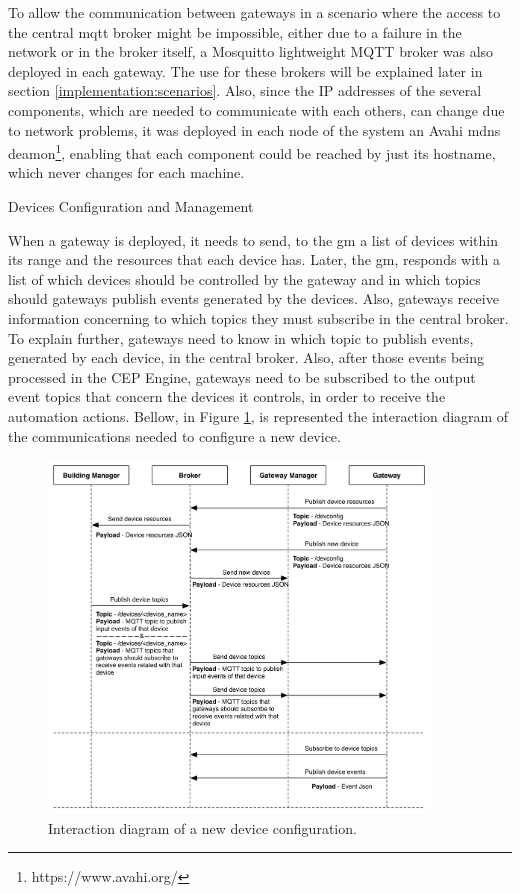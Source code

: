 To allow the communication between gateways in a scenario where the access to the central \ac{mqtt} broker might be impossible, either due to a failure in the network or in the broker itself, a Mosquitto lightweight MQTT broker was also deployed in each gateway. The use for these brokers will be explained later in section \ref{implementation:scenarios}. Also, since the IP addresses of the several components, which are needed to communicate with each others, can change due to network problems, it was deployed in each node of the system an Avahi \acf{mdns} deamon\footnote{https://www.avahi.org/}, enabling that each component could be reached by just its hostname, which never changes for each machine.


\begin{Paragraph}{Devices Configuration and Management}

When a gateway is deployed, it needs to send, to the \ac{gm} a list of devices within its range and the resources that each device has. Later, the \ac{gm}, responds with a list of which devices should be controlled by the gateway and in which topics should gateways publish events generated by the devices. Also, gateways receive information concerning to which topics they must subscribe in the central broker. To explain further, gateways need to know in which topic to publish events, generated by each device, in the central broker. Also, after those events being processed in the CEP Engine, gateways need to be subscribed to the output event topics that concern the devices it controls, in order to receive the automation actions. Bellow, in Figure \ref{fig:newdevice}, is represented the interaction diagram of the communications needed to configure a new device. 


\begin{figure}[H]
	\centering
	\includegraphics[width=0.9\textwidth]{figures/newdevice.png}
	\caption{Interaction diagram of a new device configuration.}
	\label{fig:newdevice}
\end{figure}


	
\end{Paragraph}
\newpage

